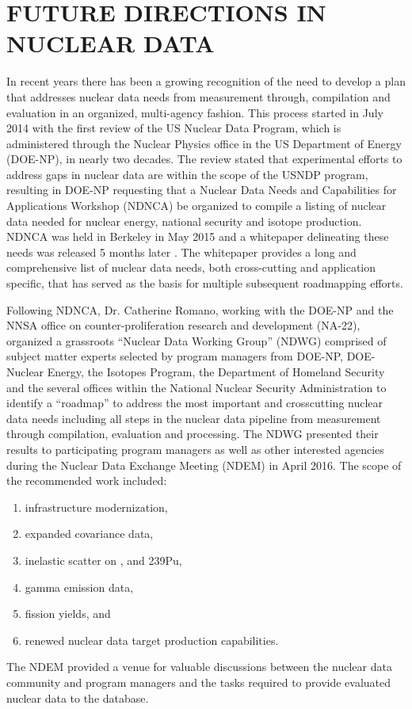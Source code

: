 \documentclass[letterpaper]{ar-1col}
\begin{document}
\section{FUTURE DIRECTIONS IN NUCLEAR DATA}

In recent years there has been a growing recognition of the need to develop a plan that addresses nuclear data needs from measurement through, compilation and evaluation in an organized, multi-agency fashion.
 This process started in July 2014 with the first review of the US Nuclear Data Program, which is administered through the Nuclear Physics office in the US Department of Energy (DOE-NP), in nearly two decades.
 The review stated that experimental efforts to address gaps in nuclear data are within the scope of the USNDP program, resulting in  DOE-NP requesting that a Nuclear Data Needs and Capabilities for Applications Workshop (NDNCA) be organized to compile a listing of nuclear data needed for nuclear energy, national security and isotope production.
 NDNCA was held in Berkeley in May 2015  and a whitepaper delineating these needs was released 5 months later \cite{bernstein2015nuclear}.
  The whitepaper provides a long and comprehensive list of nuclear data needs, both cross-cutting and application specific, that has served as the basis for multiple subsequent roadmapping efforts.

Following NDNCA, Dr. Catherine Romano, working with the DOE-NP and the NNSA office on counter-proliferation research and development (NA-22), organized a grassroots \enquote{Nuclear Data Working Group} (NDWG) comprised of subject matter experts selected by program managers from DOE-NP, DOE-Nuclear Energy, the Isotopes Program, the Department of Homeland Security and the several offices within the National Nuclear Security Administration to identify a \enquote{roadmap} to address the most important and crosscutting nuclear data needs including all steps in the nuclear data pipeline from measurement through compilation, evaluation and processing.
 The NDWG presented their results to participating program managers as well as other interested agencies during the Nuclear Data Exchange Meeting (NDEM) in April 2016.
 The scope of the recommended work included:
\begin{enumerate}
  \item infrastructure modernization, 
  \item expanded covariance data, 
  \item inelastic scatter on ,  and 239Pu, 
  \item gamma emission data, 
  \item fission yields, and 
  \item renewed nuclear data target production capabilities.
\end{enumerate}  
The NDEM provided a venue for valuable discussions between the nuclear data community and program managers and the tasks required to provide evaluated nuclear data to the database.  
\end{document}
